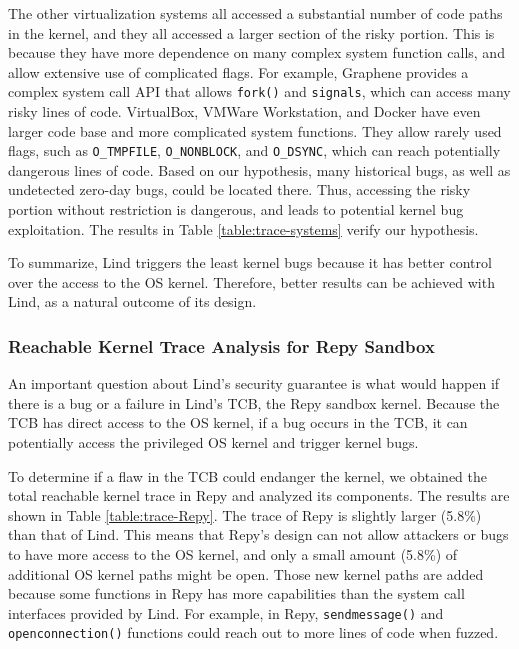 The other virtualization systems all accessed a substantial number of code
paths in the kernel, 
and they all accessed a larger section of the risky portion. 
This is because they have 
more dependence on many complex system function calls, and 
allow extensive use of complicated flags. For example, 
Graphene provides a complex system call API that allows 
\texttt{fork()} and \texttt{signals}, which can access many risky lines of code. 
VirtualBox, VMWare Workstation, and Docker have even larger 
code base and more complicated system functions. They allow 
rarely used flags, such as \texttt{O\_TMPFILE}, \texttt{O\_NONBLOCK}, 
and \texttt{O\_DSYNC}, which can reach potentially dangerous lines 
of code.  
%
Based on our hypothesis, many historical bugs, as well as undetected
zero-day bugs, could be located there. 
Thus, accessing the risky portion without restriction is dangerous, and
leads to potential kernel bug exploitation. The results in Table 
\ref{table:trace-systems} verify our hypothesis.

To summarize, Lind triggers the least kernel bugs because 
it has better control over the access to the OS kernel. 
Therefore, better results can be achieved with Lind, as a natural
outcome of its design.

\subsubsection{Reachable Kernel Trace Analysis for Repy Sandbox}
\label{Reachable-Kernel-Trace-Analysis-for-Repy-Sandbox}

An important question about Lind's security guarantee is what would happen if
there is a bug or a failure in Lind's TCB, 
the Repy sandbox kernel. Because the TCB has direct access to the OS
kernel, if a bug occurs in the TCB, 
it can potentially access the privileged OS kernel and trigger kernel bugs. 

To determine if a flaw in the TCB could endanger the kernel, 
we obtained the total reachable kernel trace in Repy and analyzed its
components. 
The results are shown in Table \ref{table:trace-Repy}. The trace of Repy is
slightly larger (5.8\%) than that of Lind.
This means that Repy's design can not allow attackers or bugs to 
have more access to the OS kernel, and only a small amount (5.8\%) of
additional OS kernel paths might be open. 
Those new kernel paths are added because some functions in Repy 
has more capabilities than the system call interfaces 
provided by Lind. For example, in Repy, 
\texttt{sendmessage()} and \texttt{openconnection()}
functions could reach out to more lines of code when fuzzed.  

